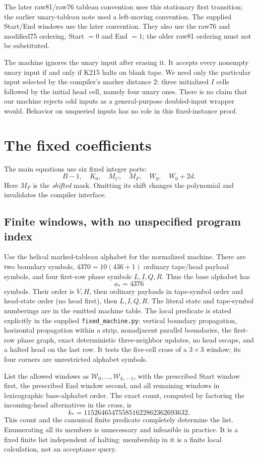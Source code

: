 \documentclass[11pt]{article}
\theoremstyle{remark}\newtheorem{remark}[theorem]{Remark}
\begin{document}
The later raw81/raw76 tableau convention uses this stationary first transition; the earlier unary-tableau note used a left-moving convention. The supplied Start/End windows use the later convention. They also use the raw76 and modified75 ordering, Start $=0$ and End $=1$; the older raw81 ordering must not be substituted.

The machine ignores the unary input after erasing it. It accepts every nonempty unary input if and only if K215 halts on blank tape. We need only the particular input selected by the compiler's marker distance $2$: three initialized $I$ cells followed by the initial head cell, namely four unary ones. There is no claim that our machine rejects odd inputs as a general-purpose doubled-input wrapper would. Behavior on unqueried inputs has no role in this fixed-instance proof.

\section{The fixed coefficients}\label{sec:coefficients}

The main equations use six fixed integer ports:
\[
 B-1,\quad K_0,\quad M_C,\quad M_F,\quad W_0,\quad W_0+2d.
\]
Here $M_F$ is the \emph{shifted} mask. Omitting its shift changes the polynomial and invalidates the compiler interface.

\subsection{Finite windows, with no unspecified program index}

Use the helical marked-tableau alphabet for the normalized machine. There are two boundary symbols, $4370=10(436+1)$ ordinary tape/head payload symbols, and four first-row phase symbols $L,I,Q,R$. Thus the base alphabet has
\[
 a_*=4376
\]
symbols. Their order is $V,H$, then ordinary payloads in tape-symbol order and head-state order (no head first), then $L,I,Q,R$. The literal state and tape-symbol numberings are in the emitted machine table. The local predicate is stated explicitly in the supplied \texttt{fixed\_machine.py}: vertical boundary propagation, horizontal propagation within a strip, nonadjacent parallel boundaries, the first-row phase graph, exact deterministic three-neighbor updates, no head escape, and a halted head on the last row. It tests the five-cell cross of a $3\times3$ window; its four corners are unrestricted alphabet symbols.

List the allowed windows as $\mathcal W_0,\ldots,\mathcal W_{k_*-1}$, with the prescribed Start window first, the prescribed End window second, and all remaining windows in lexicographic base-alphabet order. The exact count, computed by factoring the incoming-head alternatives in the cross, is
\[
 k_*=115264654755851622862362693632.
\]
This count and the canonical finite predicate completely determine the list. Enumerating all its members is unnecessary and infeasible in practice. It is a fixed finite list independent of halting: membership in it is a finite local calculation, not an acceptance query.
\end{document}
